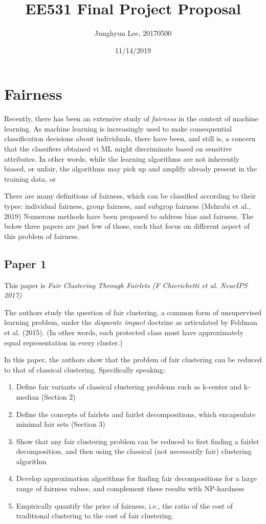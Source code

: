 \documentclass{article}
\title{EE531 Final Project Proposal}
\author{Junghyun Lee, 20170500}
\date{11/14/2019}
\begin{document}
 
\maketitle
 
\tableofcontents
 
\section{Fairness}
\indent
Recently, there has been an extensive study of \textit{fairness} in the context of machine learning.
As machine learning is increasingly used to make consequential classification decisions about individuals, there have been, and still is, a concern that the classifiers obtained vi ML might discriminate based on sensitive attributes.
In other words, while the learning algorithms are not inherently biased, or unfair, the algorithms may pick up and amplify already present in the training data, or 

There are many definitions of fairness, which can be classified according to their types: individual fairness, group fairness, and subgrop fairness (Mehrabi et al., 2019)
Numerous methods have been proposed to address bias and fairness. The below three papers are just few of those, each that focus on different aspect of this problem of fairness.
 
\subsection{Paper 1}
This paper is \textit{Fair Clustering Through Fairlets (F Chierichetti et al. NeurIPS 2017)}

The authors study the question of fair clustering, a common form of unsupervised learning problem, under the \textit{disparate impact} doctrine as articulated by Feldman et al. (2015).
(In other words, each protected class must have approximately equal representation in every cluster.)

In this paper, the authors show that the problem of fair clustering can be reduced to that of classical clustering.
Specifically speaking:

\begin{enumerate}
\item Define fair variants of classical clustering problems such as k-center and k-median (Section 2)
\item Define the concepts of fairlets and fairlet decompositions, which encapsulate minimal fair sets (Section 3)
\item Show that any fair clustering problem can be reduced to first finding a fairlet decomposition, and then using the classical (not necessarily fair) clustering algorithm
\item Develop approximation algorithms for finding fair decompositions for a large range of fairness values, and complement these results with NP-hardness
\item Empirically quantify the price of fairness, i.e., the ratio of the cost of traditional clustering to the cost of fair clustering.
\end{enumerate}
\end{document}
